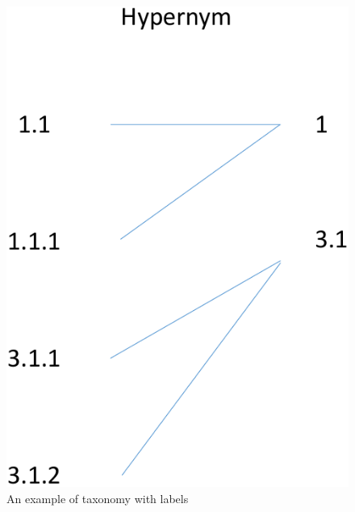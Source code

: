 \documentclass{sig-alternate}
\begin{document}
\begin{figure}[t]
\centering
\includegraphics[scale=0.4]{figures/labeljoins}
 \caption{An example of taxonomy with labels}
\label{fig:taxonomy}
\end{figure}
\end{document}

